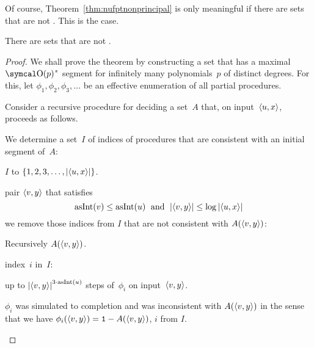 Of course, Theorem~\ref{thm:nufptnonprincipal} is only meaningful if there are  sets that are not .
This is the case.
\begin{theorem}
  There are  sets that are not .
\end{theorem}
\begin{proof}
  We shall prove the theorem by constructing a  set that has a maximal $\bigO(p)$"~segment for infinitely many polynomials~$p$ of distinct degrees.
  For this, let $\phi_1, \phi_2, \phi_3, \ldots$ be an effective enumeration of all partial procedures.

  Consider a recursive procedure for deciding a set~$A$ that, on input~${\langle u, x\rangle}$, proceeds as follows.
  \begin{codelisting}
  \item
    We determine a set~$I$ of indices of procedures that are consistent with an initial segment of~$A$:
    \begin{codelisting}
    \item
       $I$ to $\{1, 2, 3, \ldots, \length{\pair{u}{x}}\}$.
    \item
       pair $\pair{v}{y}$ that satisfies
      \begin{equation*}
        \asNat(v) \le \asNat(u) \reland \length{\pair{v}{y}} \le \log \length{\pair{u}{x}}
      \end{equation*}
      we remove those indices from $I$ that are not consistent with $A(\pair{v}{y})$:
      \begin{codelisting}
      \item
        Recursively  $A(\pair{v}{y})$.
      \item
         index~$i$ in~$I$:
        \begin{codelisting}
        \item
           up to $\length{\pair{v}{y}}^{3 \cdot \asNat(u)}$ steps of~$\phi_i$ on input~$\pair{v}{y}$.
        \item
           $\phi_i$ was simulated to completion and was inconsistent with $A(\pair{v}{y})$ in the sense that we have $\phi_i(\pair{v}{y}) = \bits{1} - A(\pair{v}{y})$,
          \itemcont {} $i$ from $I$.
        \end{codelisting}
      \end{codelisting}
    \end{codelisting}
  \item

\end{codelisting}
\end{proof}
